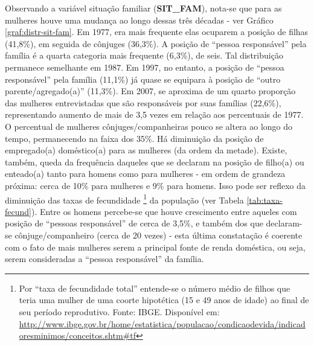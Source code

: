 \clearpage
Observando a variável situação familiar (\textbf{SIT_FAM}), nota-se que para as mulheres houve uma mudança ao longo dessas três décadas - ver Gráfico \ref{graf:distr-sit-fam}.
Em 1977, era mais frequente elas ocuparem a posição de filhas (41,8\%), em seguida de cônjuges (36,3\%).
A posição de ``pessoa responsável'' pela família é a quarta categoria mais frequente (6,3\%), de seis.
Tal distribuição permanece semelhante em 1987.
Em 1997, no entanto, a posição de ``pessoa responsável'' pela família (11,1\%) já quase se equipara à posição de ``outro parente/agregado(a)'' (11,3\%). Em 2007, se aproxima de um quarto proporção das mulheres entrevistadas que são responsáveis por suas famílias (22,6\%), representando aumento de mais de 3,5 vezes em relação aos percentuais de 1977. O percentual de mulheres cônjuges/companheiras pouco se altera ao longo do tempo, permanecendo na faixa dos 35\%. Há diminuição da posição de empregado(a) doméstico(a) para as mulheres (da ordem da metade). Existe, também, queda da frequência daqueles que se declaram na posição de filho(a) ou enteado(a) tanto para homens como para mulheres - em ordem de grandeza próxima: cerca de 10\% para mulheres e 9\% para homens. Isso pode ser reflexo da diminuição das taxas de fecundidade%
\footnote{Por ``taxa de fecundidade total'' entende-se o número médio de filhos que teria uma mulher de uma coorte hipotética (15 e 49 anos de idade) ao final de seu período reprodutivo. Fonte: IBGE. Disponível em: \url{http://www.ibge.gov.br/home/estatistica/populacao/condicaodevida/indicadoresminimos/conceitos.shtm\#tf}} 
da população (ver Tabela \ref{tab:taxa-fecund}). Entre os homens percebe-se que houve crescimento entre aqueles com posição de ``pessoas responsável'' de cerca de 3,5\%, e também dos que declaram-se cônjuge/companheiro (cerca de 20 vezes) - esta última constatação é coerente com o fato de mais mulheres serem a principal fonte de renda doméstica, ou seja, serem consideradas a ``pessoa responsável'' da família.

